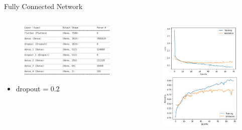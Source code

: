\documentclass[aspectratio=1610, 9pt]{beamer}
\begin{document}
\begin{frame}{Fully Connected Network}
  \begin{columns}
    \begin{column}{0.48 \textwidth }
      \begin{figure}
        \centering
        \includegraphics[width = 0.8\textwidth]{images/NN.png}
      \end{figure}
      \begin{itemize}
        \item []dropout = $0.2$
      \end{itemize}
    \end{column}
    \begin{column}{0.48 \textwidth }
      \centering
      \includegraphics[width = 0.8\textwidth]{images/History.png}
    \end{column}
  \end{columns}
\end{frame}
\end{document}
